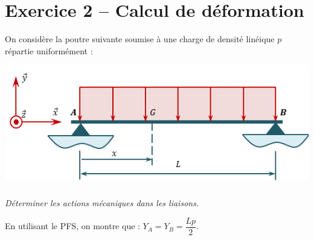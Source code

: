 \documentclass[10pt,fleqn]{article} %
\begin{document}
\section*{Exercice 2 -- Calcul de déformation}

\setcounter{subparagraph}{0}
On considère la poutre suivante soumise à une charge de densité linéique $p$ répartie uniformément :
\begin{center}
\includegraphics[width=.45\textwidth]{images/fig_02}
\end{center}
\subparagraph{}\textit{Déterminer les actions mécaniques dans les liaisons.}
\ifprof
\begin{corrige}
En utilisant le PFS, on montre que : $Y_A = Y_B = \dfrac{Lp}{2}$.
\end{corrige}
\else
\fi
\end{document}
